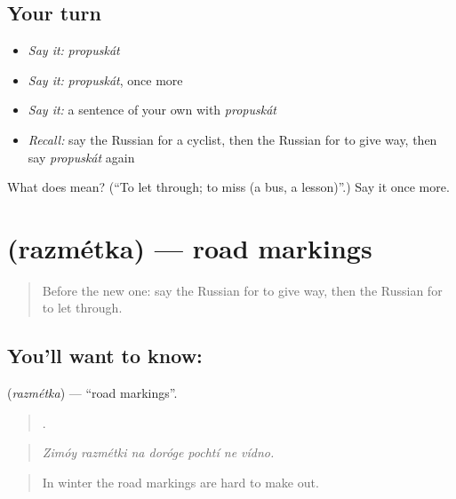\subsection*{Your turn}
\begin{itemize}
\raggedright
  \item \emph{Say it:} \emph{propuskát}
  \item \emph{Say it:} \emph{propuskát}, once more
  \item \emph{Say it:} a sentence of your own with \emph{propuskát}
  \item \emph{Recall:} say the Russian for a cyclist, then the Russian for to give way, then say \emph{propuskát} again
\end{itemize}

\begin{tcolorbox}[breakable,colback=teal!4,colframe=teal!35!black,title={Before you move on}]
What does  mean? (\textquotedblleft{}To let through; to miss (a bus, a lesson)\textquotedblright{}.) Say it once more.
\end{tcolorbox}
\section[\texorpdfstring{\ru{разметка} (razmétka)}{разметка (razmétka)}]{ (razmétka) — road markings}

\label{lesson:RU-C412-razmetka}



\begin{quote}
Before the new one: say the Russian for to give way, then the Russian for to let through.
\end{quote}

\subsection*{You'll want to know: }
\textbf{} (\emph{razmétka}) — \textquotedblleft{}road markings\textquotedblright{}.

\begin{quote}
      .
\end{quote}

\begin{quote}
\emph{Zimóy razmétki na doróge pochtí ne vídno.}
\end{quote}

\begin{quote}
In winter the road markings are hard to make out.
\end{quote}

